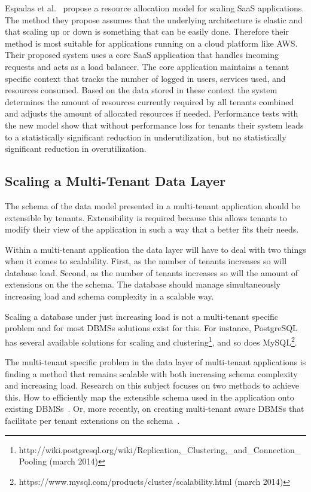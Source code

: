 Espadas et al.~\cite{espadas2013tenant} propose a resource allocation model for scaling SaaS applications.
The method they propose assumes that the underlying architecture is elastic and that scaling up or down is something that can be easily done.
Therefore their method is most suitable for applications running on a cloud platform like \ac{AWS}. 
Their proposed system uses a core SaaS application that handles incoming requests and acts as a load balancer. The core application maintains a tenant specific context that tracks the number of logged in users, services used, and resources consumed.
Based on the data stored in these context the system determines the amount of resources currently required by all tenants combined and adjusts the amount of allocated resources if needed.
Performance tests with the new model show that without performance loss for tenants their system leads to a statistically significant reduction in underutilization, but no statistically significant reduction in overutilization. 


\subsection{Scaling a Multi-Tenant Data Layer}
The schema of the data model presented in a multi-tenant application should be extensible by tenants.
Extensibility is required because this allows tenants to modify their view of the application in such a way that a better fits their needs.

Within a multi-tenant application the data layer will have to deal with two things when it comes to scalability.
First, as the number of tenants increases so will database load.
Second, as the number of tenants increases so will the amount of extensions on the the schema.
The database should  manage simultaneously increasing load and schema complexity in a scalable way.

Scaling a database under just increasing load is not a multi-tenant specific problem and for most \acp{DBMS} solutions exist for this. 
For instance, PostgreSQL has several available solutions for scaling and clustering\footnote{http://wiki.postgresql.org/wiki/Replication,\_Clustering,\_and\_Connection\_Pooling (march 2014)}, and so does MySQL\footnote{https://www.mysql.com/products/cluster/scalability.html (march 2014)}.

The multi-tenant specific problem in the data layer of multi-tenant applications is finding a method that remains scalable with both increasing schema complexity and increasing load.
Research on this subject focuses on two methods to achieve this.
How to efficiently map the extensible schema used in the application onto existing \acp{DBMS}~\cite{aulbach2008multi, aulbach2009comparison}.
Or, more recently, on creating multi-tenant aware \acp{DBMS} that facilitate per tenant extensions on the schema~\cite{schiller2011native, aulbach2011extensibility}.

